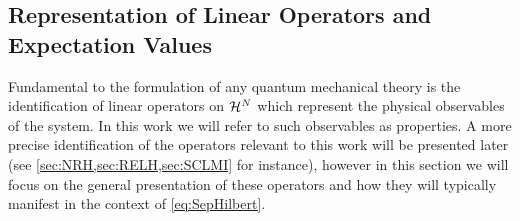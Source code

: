 \subsection{Representation of Linear Operators and Expectation Values}
\label{sec:LO}

Fundamental to the formulation of any quantum mechanical theory is the identification of linear operators on $\mathcal{H}^N$
which represent the physical observables of the system. In this work we will refer to such observables as properties. A
more precise identification of the operators relevant to this work will be presented later 
(see \cref{sec:NRH,sec:RELH,sec:SCLMI} for instance), however in this section we will focus on the general presentation
of these operators and how they will typically manifest in the context of \cref{eq:SepHilbert}. 

